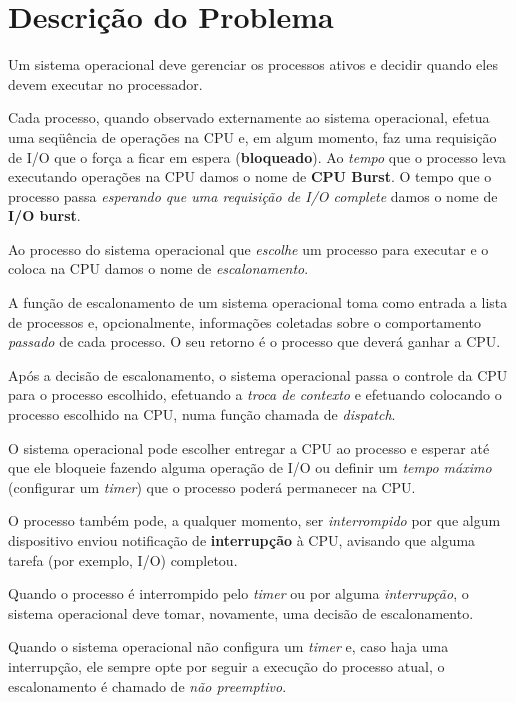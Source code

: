 \documentclass[a4paper, oneside,12pt]{article}
\begin{document}
\finishgrading    %

\section{Descrição do Problema} \label{sec:desc_prob}

Um sistema operacional deve gerenciar os processos ativos e decidir quando
eles devem executar no processador.

Cada processo, quando observado externamente ao sistema operacional, efetua uma seqüência de operações na CPU e, em algum momento, faz uma requisição de I/O que o força a ficar em espera (\textbf{bloqueado}). Ao \emph{tempo} que o processo leva executando operações na CPU damos o nome de \textbf{CPU Burst}.  O tempo que o processo passa \emph{esperando que uma requisição de I/O complete} damos o nome de \textbf{I/O burst}.

Ao processo do sistema operacional que \emph{escolhe} um processo para executar e o coloca na CPU damos o nome de \emph{escalonamento}.

A função de escalonamento de um sistema operacional toma como entrada a lista de processos e, opcionalmente, informações coletadas sobre o comportamento \emph{passado} de cada processo. O seu retorno é o processo que deverá ganhar a CPU.

Após a decisão de escalonamento, o sistema operacional passa o controle da CPU para o processo escolhido, efetuando a \emph{troca de contexto} e efetuando colocando o processo escolhido na CPU, numa função chamada de \emph{dispatch}.

O sistema operacional pode escolher entregar a CPU ao processo e esperar até que ele bloqueie fazendo alguma operação de I/O ou definir um {\em tempo máximo} (configurar um {\em timer}) que o processo poderá permanecer na CPU.

O processo também pode, a qualquer momento, ser \emph{interrompido} por que algum dispositivo enviou notificação de \textbf{interrupção} à CPU, avisando que alguma tarefa (por exemplo, I/O) completou.

Quando o processo é interrompido pelo \emph{timer} ou por alguma {\em interrupção}, o sistema operacional deve tomar, novamente, uma decisão de escalonamento.

Quando o sistema operacional não configura um \emph{timer} e, caso haja uma interrupção, ele sempre opte por seguir a execução do processo atual, o escalonamento é chamado de \emph{não preemptivo}.
\end{document}
